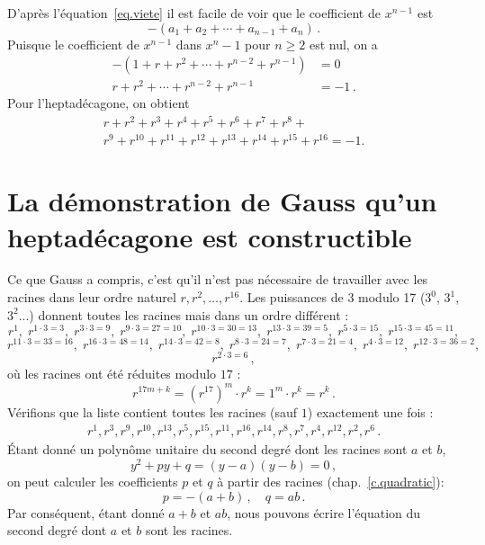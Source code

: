 D'après l'équation~\ref{eq.viete} il est facile de voir que le coefficient de $x^{n-1}$ est 
\[
-(a_1+a_2+\cdots+a_{n-1}+a_n)\,.
\]
Puisque le coefficient de $x^{n-1}$ dans $x^n-1$ pour $n\geq 2$ est nul, on a 
\begin{align*}
-(1+r+r^2+\cdots + r^{n-2}+r^{n-1})&=0\\
r+r^2+\cdots + r^{n-2}+r^{n-1}&=-1\,.
\end{align*}
Pour l'heptadécagone, on obtient
\begin{multline}
r+r^2+r^3+r^4+r^5+r^6+r^7+r^8+\\
r^9+r^{10}+r^{11}+r^{12}+r^{13}+r^{14} + r^{15}+r^{16}=-1.\label{eq.minus-one}
\end{multline}

\section{La démonstration de Gauss qu'un heptadécagone est constructible}\label{s.gauss}

Ce que Gauss a compris, c'est qu'il n'est pas nécessaire de travailler avec les racines dans leur ordre naturel $r,r^2,\ldots,r^{16}$. Les puissances de $3$ modulo 17 ($3^0$, $3^1$, $3^2$...) donnent toutes les racines mais dans un ordre différent :
\[
r^1, \;r^{1\cdot 3 =3},\; r^{3\cdot 3=9},\; r^{9\cdot 3=27=10},\; r^{10\cdot 3=30=13},\; r^{13\cdot 3=39=5},\; r^{5\cdot 3=15},\; r^{15\cdot 3=45=11},\]
\[
r^{11\cdot 3 =33=16}, \;r^{16\cdot 3=48=14},\; r^{14\cdot 3=42=8},\; r^{8\cdot 3=24=7},\;r^{7\cdot 3=21=4},\; r^{4\cdot 3=12},\; r^{12\cdot 3=36=2},\; \]
\[r^{2\cdot 3=6}\,,\]
où les racines ont été réduites modulo $17$ :
\[
r^{17m+k}=(r^{17})^m\cdot r^k=1^m\cdot r^k=r^k\,.
\]
Vérifions que la liste contient toutes les racines (sauf $1$) exactement une fois :
\begin{align}\label{eq.roots}
r^1, r^3, r^9, r^{10}, r^{13}, r^5, r^{15}, r^{11}, r^{16}, r^{14}, r^8, r^7, r^4, r^{12}, r^2, r^6\,.
\end{align}
Étant donné un polynôme unitaire du second degré  dont les racines sont $a$ et $b$,
\[
y^2+py+q=(y-a)(y-b)=0\,,
\]
on peut calculer les coefficients $p$ et $q$ à partir des racines 
 (chap.~\ref{c.quadratic}):
\[
p=-(a+b)\,,\quad q=ab\,.
\]
Par conséquent, étant donné $a+b$ et $ab$, nous pouvons écrire l'équation du second degré dont $a$ et $b$ sont les racines.


